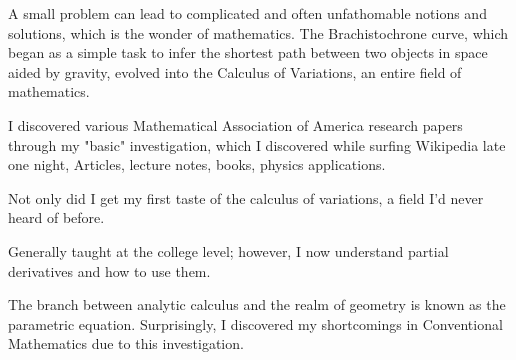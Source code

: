 

{A small problem can lead to complicated and often unfathomable notions and solutions, which is the wonder of mathematics. The Brachistochrone curve, which began as a simple task to infer the shortest path between two objects in space aided by gravity, evolved into the Calculus of Variations, an entire field of mathematics.}

{I discovered various Mathematical Association of America research papers through my "basic" investigation, which I discovered while surfing Wikipedia late one night, Articles, lecture notes, books, physics applications.}

{Not only did I get my first taste of the calculus of variations, a field I'd never heard of before.}

{Generally taught at the college level; however, I now understand partial derivatives and how to use them.}

{The branch between analytic calculus and the realm of geometry is known as the parametric equation.
Surprisingly, I discovered my shortcomings in Conventional Mathematics due to this investigation.}

{}

{}

